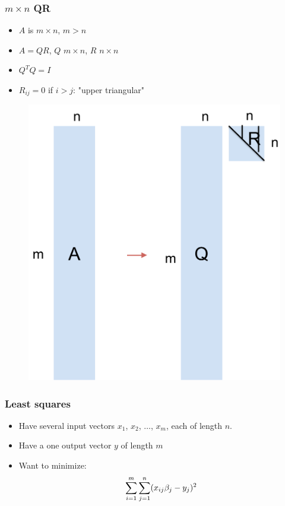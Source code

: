 \documentclass{beamer}
\begin{document}
\begin{frame}
\frametitle{$m \times n$ QR}

\begin{itemize}
\item $A$ is $m \times n$, $m > n$
\item $A = QR$, $Q$ $m \times n$, $R$ $n \times n$
\item $Q^TQ = I$
\item $R_{ij} = 0$ if $i > j$: "upper triangular"
\end{itemize}

\begin{figure}
\includegraphics[scale=0.3]{figs/tsqr.pdf}
\end{figure}

\end{frame}

\begin{frame}
\frametitle{Least squares}

\begin{itemize}
\item Have several input vectors $x_1$, $x_2$, $\ldots$, $x_m$, each of length $n$.
\item Have a one output vector $y$ of length $m$
\item Want to minimize:
\[
 \displaystyle\sum\limits_{i=1}^{m} \displaystyle\sum\limits_{j=1}^{n} (x_{ij}\beta_j - y_j)^2
 \]
\end{itemize}

\end{frame}
\end{document}
